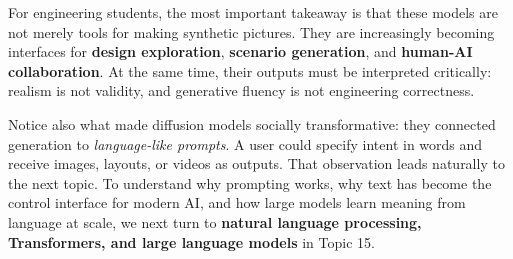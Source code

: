 \documentclass[12pt]{article}
\begin{document}
For engineering students, the most important takeaway is that these models are not merely tools for making synthetic pictures. They are increasingly becoming interfaces for \textbf{design exploration}, \textbf{scenario generation}, and \textbf{human-AI collaboration}. At the same time, their outputs must be interpreted critically: realism is not validity, and generative fluency is not engineering correctness.

Notice also what made diffusion models socially transformative: they connected generation to \emph{language-like prompts}. A user could specify intent in words and receive images, layouts, or videos as outputs. That observation leads naturally to the next topic. To understand why prompting works, why text has become the control interface for modern AI, and how large models learn meaning from language at scale, we next turn to \textbf{natural language processing, Transformers, and large language models} in Topic 15.
\end{document}
